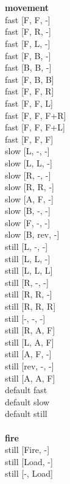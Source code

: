  
\ \\



\ \\ {\bf movement } \\
fast [F, F, -] \\
fast [F, R, -] \\
fast [F, L, -] \\
fast [F, B, -] \\
fast [B, B, -] \\
fast [F, B, B] \\
fast [F, F, R] \\
fast [F, F, L] \\
fast [F, F, F+R] \\
fast [F, F, F+L] \\
fast [F, F, F] \\
slow [L, -, -] \\
slow [L, L, -] \\
slow [R, -, -] \\
slow [R, R, -] \\
slow [A, F, -] \\
slow [B, -, -] \\
slow [F, -, -] \\
slow [B, rev, -] \\
still [L, -, -] \\
still [L, L, -] \\
still [L, L, L] \\
still [R, -, -] \\
still [R, R, -] \\
still [R, R, R] \\
still [-, -, -] \\
still [R, A, F] \\
still [L, A, F] \\
still [A, F, -] \\
still [rev, -, -] \\
still [A, A, F] \\
default fast \\
default slow \\
default still \\
\ \\ {\bf fire } \\
still [Fire, -] \\
still [Load, -] \\
still [-, Load] \\


